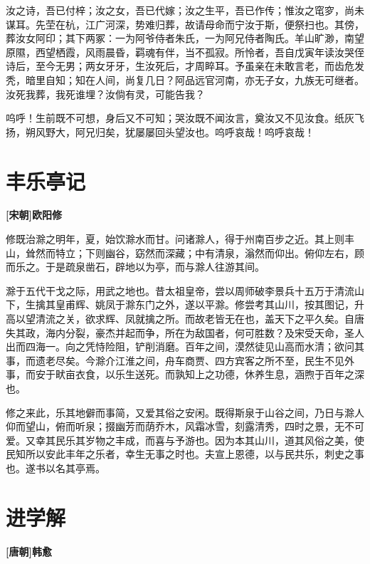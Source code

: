 \documentclass[UTF8,titlepage,oneside]{ctexbook}
\begin{document}
汝之诗，吾已付梓；汝之女，吾已代嫁；汝之生平，吾已作传；惟汝之窀穸，尚未谋耳。先茔在杭，江广河深，势难归葬，故请母命而宁汝于斯，便祭扫也。其傍，葬汝女阿印；其下两冢：一为阿爷侍者朱氏，一为阿兄侍者陶氏。羊山旷渺，南望原隰，西望栖霞，风雨晨昏，羁魂有伴，当不孤寂。所怜者，吾自戊寅年读汝哭侄诗后，至今无男；两女牙牙，生汝死后，才周睟耳。予虽亲在未敢言老，而齿危发秃，暗里自知；知在人间，尚复几日？阿品远官河南，亦无子女，九族无可继者。汝死我葬，我死谁埋？汝倘有灵，可能告我？


呜呼！生前既不可想，身后又不可知；哭汝既不闻汝言，奠汝又不见汝食。纸灰飞扬，朔风野大，阿兄归矣，犹屡屡回头望汝也。呜呼哀哉！呜呼哀哉！



\chapter*{丰乐亭记}
\begin{center}
	\textbf{[宋朝]欧阳修}
\end{center}

修既治滁之明年，夏，始饮滁水而甘。问诸滁人，得于州南百步之近。其上则丰山，耸然而特立；下则幽谷，窈然而深藏；中有清泉，滃然而仰出。俯仰左右，顾而乐之。于是疏泉凿石，辟地以为亭，而与滁人往游其间。


滁于五代干戈之际，用武之地也。昔太祖皇帝，尝以周师破李景兵十五万于清流山下，生擒其皇甫辉、姚凤于滁东门之外，遂以平滁。修尝考其山川，按其图记，升高以望清流之关，欲求辉、凤就擒之所。而故老皆无在也，盖天下之平久矣。自唐失其政，海内分裂，豪杰并起而争，所在为敌国者，何可胜数？及宋受天命，圣人出而四海一。向之凭恃险阻，铲削消磨。百年之间，漠然徒见山高而水清；欲问其事，而遗老尽矣。今滁介江淮之间，舟车商贾、四方宾客之所不至，民生不见外事，而安于畎亩衣食，以乐生送死。而孰知上之功德，休养生息，涵煦于百年之深也。


修之来此，乐其地僻而事简，又爱其俗之安闲。既得斯泉于山谷之间，乃日与滁人仰而望山，俯而听泉；掇幽芳而荫乔木，风霜冰雪，刻露清秀，四时之景，无不可爱。又幸其民乐其岁物之丰成，而喜与予游也。因为本其山川，道其风俗之美，使民知所以安此丰年之乐者，幸生无事之时也。夫宣上恩德，以与民共乐，刺史之事也。遂书以名其亭焉。



\chapter*{进学解}
\begin{center}
	\textbf{[唐朝]韩愈}
\end{center}
\end{document}
